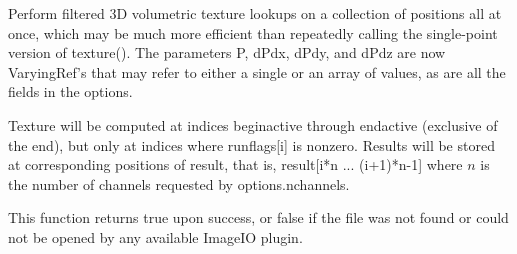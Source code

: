 
Perform filtered 3D volumetric texture lookups on a collection of positions all at
once, which may be much more efficient than repeatedly calling the
single-point version of {\cf texture()}.  The parameters {\cf P},
{\cf dPdx}, {\cf dPdy}, and {\cf dPdz} are now
{\cf VaryingRef}'s that may refer to either a single or an array of
values, as are all the fields in the {\cf options}.

Texture will be computed at indices {\cf beginactive} through
{\cf endactive} (exclusive of the end), but only at indices where {\cf runflags[i]}
is nonzero.  Results will be stored at corresponding positions of
{\cf result}, that is, {\cf result[i*n ... (i+1)*n-1]} where $n$ 
is the number of channels requested by {\cf options.nchannels}.

This function returns {\cf true} upon success, or {\cf false} if the
file was not found or could not be opened by any available ImageIO
plugin.
\apiend

